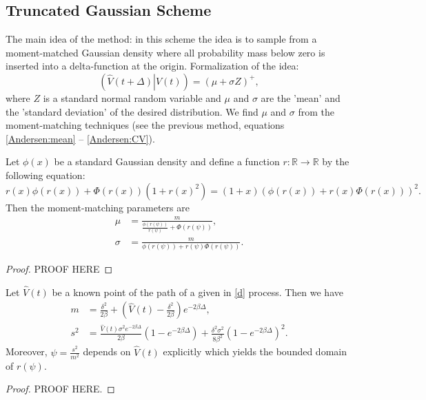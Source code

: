         \subsection{Truncated Gaussian Scheme}
            The main idea of the method: in this scheme the idea is to sample from a moment-matched Gaussian density 
            where all probability mass below zero is inserted into a delta-function at the origin. Formalization of the idea:
            \begin{equation}
                \left(\left.\hat{V}(t+\Delta)\right| V(t)\right) = \left(\mu + \sigma Z\right)^+,
            \end{equation}
            where $Z$ is a standard normal random variable and $\mu$ and $\sigma$ are the 'mean' and the 'standard 
            deviation' of the desired distribution.
            We find $\mu$ and $\sigma$ from the moment-matching techniques (see the previous method,  
            equations \eqref{Andersen:mean} -- \eqref{Andersen:CV}).

            \begin{lemma}
                Let $\phi(x)$ be a standard Gaussian density and define a function $r:\mathbb{R} \to \mathbb{R}$ by 
                the following equation:
                \begin{equation}
                    r(x)\phi(r(x))+\Phi(r(x))(1+r(x)^2)= (1+x)\left(\phi(r(x)) + r(x)\Phi(r(x))\right)^2.
                \end{equation}
                Then the moment-matching parameters are
                \begin{align}
                    \mu &= \frac{m}{\frac{\phi(r(\psi))}{r(\psi)} + \Phi(r(\psi))},\\ 
                    \sigma &= \frac{m}{\phi(r(\psi)) + r(\psi)\Phi(r(\psi))}.
                \end{align}
            \end{lemma}
            \begin{proof}
                {\color{red}PROOF HERE}
            \end{proof}

        \begin{lemma}
            Let $\hat{V}(t)$ be a known point of the path of a given in \eqref{d} process. Then we have
            \begin{align}
                m   &= \frac{\delta^2}{2\beta} + \left(\hat{V}(t) - \frac{\delta^2}{2\beta}\right)e^{-2\beta \Delta},\\
                s^2 &= \frac{\hat{V}(t)\sigma^2e^{-2\beta \Delta}}{2\beta}\left(1 - e^{-2\beta \Delta}\right) + \frac{\delta^2\sigma^2}{8\beta^2}\left(1 - e^{-2\beta \Delta}\right)^2.
            \end{align}
            Moreover, $\psi = \frac{s^2}{m^2}$ depends on $\hat{V}(t)$ explicitly which yields the bounded domain of $r(\psi)$.
        \end{lemma}
        \begin{proof}
            {\color{red}PROOF HERE.}
        \end{proof}

